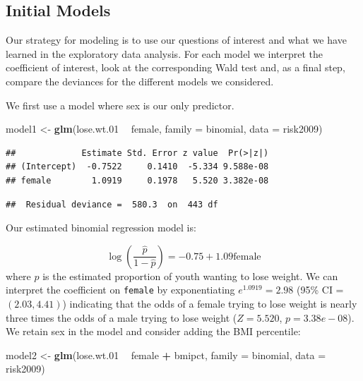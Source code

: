 \documentclass[
]{krantz}
\newenvironment{Shaded}{\begin{snugshade}}{\end{snugshade}}
\newcommand{\DataTypeTok}[1]{\textcolor[rgb]{0.27,0.27,0.27}{#1}}
\newcommand{\FloatTok}[1]{\textcolor[rgb]{0.06,0.06,0.06}{#1}}
\newcommand{\KeywordTok}[1]{\textcolor[rgb]{0.27,0.27,0.27}{\textbf{#1}}}
\newcommand{\NormalTok}[1]{#1}
\newcommand{\OperatorTok}[1]{\textcolor[rgb]{0.43,0.43,0.43}{\textbf{#1}}}
\newcommand{\StringTok}[1]{\textcolor[rgb]{0.5,0.5,0.5}{#1}}
\begin{document}
\hypertarget{initial-models-2}{%
\subsection{Initial Models}\label{initial-models-2}}

Our strategy for modeling is to use our questions of interest and what we have learned in the exploratory data analysis. For each model we interpret the coefficient of interest, look at the corresponding Wald test and, as a final step, compare the deviances for the different models we considered.

We first use a model where sex is our only predictor.

\begin{Shaded}
\begin{Highlighting}[]
\NormalTok{model1 <-}\StringTok{ }\KeywordTok{glm}\NormalTok{(lose.wt}\FloatTok{.01} \OperatorTok{~}\StringTok{ }\NormalTok{female, }\DataTypeTok{family =}\NormalTok{ binomial, }
              \DataTypeTok{data =}\NormalTok{ risk2009)}
\end{Highlighting}
\end{Shaded}

\begin{verbatim}
##             Estimate Std. Error z value  Pr(>|z|)
## (Intercept)  -0.7522     0.1410  -5.334 9.588e-08
## female        1.0919     0.1978   5.520 3.382e-08
\end{verbatim}

\begin{verbatim}
##  Residual deviance =  580.3  on  443 df
\end{verbatim}

Our estimated binomial regression model is:

\[\log\left(\frac{\hat{p}}{1-\hat{p}}\right)=-0.75+1.09 \textrm{female}\]
where \(\hat{p}\) is the estimated proportion of youth wanting to lose weight. We can interpret the coefficient on \texttt{female} by exponentiating \(e^{1.0919} = 2.98\) (95\% CI = \((2.03, 4.41)\)) indicating that the odds of a female trying to lose weight is nearly three times the odds of a male trying to lose weight (\(Z=5.520\), \(p=3.38e-08\)). We retain sex in the model and consider adding the BMI percentile:

\begin{Shaded}
\begin{Highlighting}[]
\NormalTok{model2 <-}\StringTok{ }\KeywordTok{glm}\NormalTok{(lose.wt}\FloatTok{.01} \OperatorTok{~}\StringTok{ }\NormalTok{female }\OperatorTok{+}\StringTok{ }\NormalTok{bmipct, }
              \DataTypeTok{family =}\NormalTok{ binomial, }\DataTypeTok{data =}\NormalTok{ risk2009)}
\end{Highlighting}
\end{Shaded}
\end{document}
